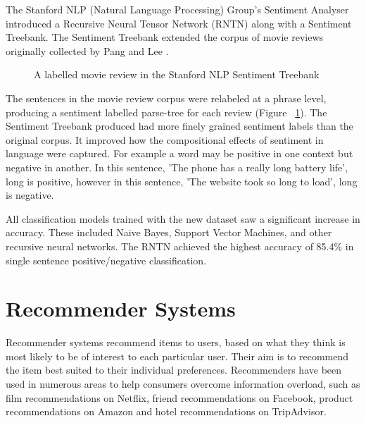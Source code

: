 The Stanford NLP (Natural Language Processing) Group's Sentiment Analyser \cite{stanfordSentiment2013} introduced a Recursive Neural Tensor Network (RNTN) along with a Sentiment Treebank. The Sentiment Treebank extended the corpus of movie reviews originally collected by Pang and Lee \cite{panglee2004}.
\begin{figure}
    \centering
    \setlength{\fboxsep}{0pt}
    \setlength{\fboxrule}{0.01pt}
    \setlength{\belowcaptionskip}{-10pt}
    \caption{A labelled movie review in the Stanford NLP Sentiment Treebank \cite{stanfordSentiment2013}}
    \label{fig:treebank}
\end{figure}
The sentences in the movie review corpus were relabeled at a phrase level, producing a sentiment labelled parse-tree for each review (Figure ~\ref{fig:treebank}). The Sentiment Treebank produced had more finely grained sentiment labels than the original corpus. It improved how the compositional effects of sentiment in language were captured. For example a word may be positive in one context but negative in another. In this sentence, 'The phone has a really long battery life', long is positive, however in this sentence, 'The website took so long to load', long is negative.

All classification models trained with the new dataset saw a significant increase in accuracy. These included Naive Bayes, Support Vector Machines, and other recursive neural networks. The RNTN achieved the highest accuracy of 85.4\% in single sentence positive/negative classification.

\section{Recommender Systems}

Recommender systems recommend items to users, based on what they think is most likely to be of interest to each particular user. Their aim is to recommend the item best suited to their individual preferences. Recommenders have been used in numerous areas to help consumers overcome information overload, such as film recommendations on Netflix, friend recommendations on Facebook, product recommendations on Amazon and hotel recommendations on TripAdvisor.

